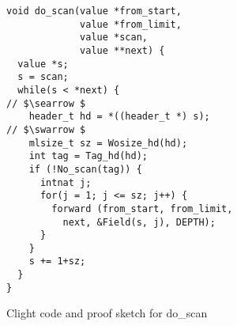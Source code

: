 \begin{figure}[t]
\vspace{-1ex}
  \begin{lstlisting}
void do_scan(value *from_start,  
             value *from_limit, 
             value *scan,  
             value **next) {
  value *s;
  s = scan;
  while(s < *next) {
// $\searrow $
    header_t hd = *((header_t *) s);
// $\swarrow $
    mlsize_t sz = Wosize_hd(hd);
    int tag = Tag_hd(hd);
    if (!No_scan(tag)) {
      intnat j;
      for(j = 1; j <= sz; j++) {
        forward (from_start, from_limit, 
          next, &Field(s, j), DEPTH);
      } 
    }
    s += 1+sz;
  }
} 
\end{lstlisting}

\vspace{-0.4em}
\caption{Clight code and proof sketch for do\_scan}
\label{fig:doscan}
\vspace{-1em}
\end{figure}
